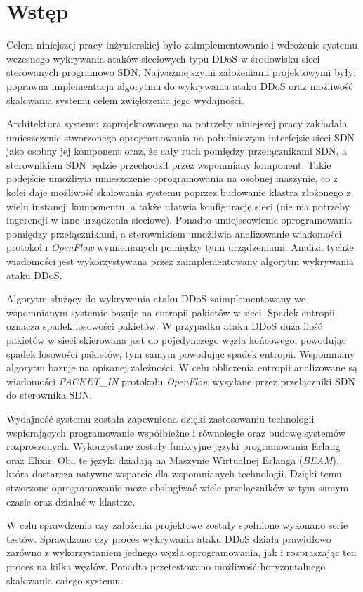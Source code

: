 \chapter{Wstęp}

Celem niniejszej pracy inżynierskiej było zaimplementowanie i wdrożenie systemu
wczesnego wykrywania ataków sieciowych typu DDoS w środowisku sieci sterowanych
programowo SDN. Najważniejszymi założeniami projektowymi były: poprawna
implementacja algorytmu do wykrywania ataku DDoS oraz możliwość skalowania
systemu celem zwiększenia jego wydajności.

Architektura systemu zaprojektowanego na potrzeby niniejszej pracy zakładała
umieszczenie stworzonego oprogramowania na południowym interfejsie sieci SDN
jako osobny jej komponent oraz, że cały ruch pomiędzy przełącznikami SDN, a
sterownikiem SDN będzie przechodził przez wspomniany komponent. Takie podejście
umożliwia umieszczenie oprogramowania na osobnej maszynie, co z kolei daje
możliwość skalowania systemu poprzez budowanie klastra złożonego z wielu
instancji komponentu, a także ułatwia konfigurację sieci (nie ma potrzeby
ingerencji w inne urządzenia sieciowe). Ponadto umiejscowienie oprogramowania
pomiędzy przełącznikami, a sterownikiem umożliwia analizowanie wiadomości
protokołu \textit{OpenFlow} wymienianych pomiędzy tymi urządzeniami. Analiza
tychże wiadomości jest wykorzystywana przez zaimplementowany algorytm wykrywania
ataku DDoS.

Algorytm służący do wykrywania ataku DDoS zaimplementowany we wspomnianym
systemie bazuje na entropii pakietów w sieci. Spadek entropii oznacza spadek
losowości pakietów. W przypadku ataku DDoS duża ilość pakietów w sieci
skierowana jest do pojedynczego węzła końcowego, powodując spadek losowości
pakietów, tym samym powodując spadek entropii. Wspomniany algorytm bazuje na
opisanej zależności. W celu obliczenia entropii analizowane są wiadomości
\textit{PACKET\_IN} protokołu \textit{OpenFlow} wysyłane przez przełączniki SDN
do sterownika SDN.

Wydajność systemu została zapewniona dzięki zastosowaniu technologii
wspierających programowanie współbieżne i równoległe oraz budowę systemów
rozproszonych. Wykorzystane zostały funkcyjne języki programowania Erlang oraz
Elixir. Oba te języki działają na Maszynie Wirtualnej Erlanga (\textit{BEAM}),
która dostarcza natywne wsparcie dla wspomnianych technologii. Dzięki temu
stworzone oprogramowanie może obsługiwać wiele przełączników w tym samym czasie
oraz działać w klastrze.

W celu sprawdzenia czy założenia projektowe zostały spełnione wykonano serie
testów. Sprawdzono czy proces wykrywania ataku DDoS działa prawidłowo zarówno z
wykorzystaniem jednego węzła oprogramowania, jak i rozpraszając ten proces na
kilka węzłów. Ponadto przetestowano możliwość horyzontalnego skalowania całego
systemu.